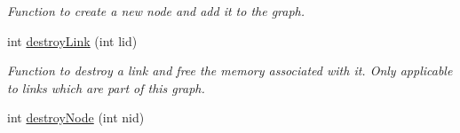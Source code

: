 \begin{DoxyCompactItemize}
\begin{DoxyCompactList}\small\item\em Function to create a new node and add it to the graph. \end{DoxyCompactList}\item 
\hypertarget{classGraph_ab55f18c45c3ffa8c8d61a5517b856e17}{int \hyperlink{classGraph_ab55f18c45c3ffa8c8d61a5517b856e17}{destroy\+Link} (int lid)}\label{classGraph_ab55f18c45c3ffa8c8d61a5517b856e17}

\begin{DoxyCompactList}\small\item\em Function to destroy a link and free the memory associated with it. Only applicable to links which are part of this graph. \end{DoxyCompactList}\item 
\hypertarget{classGraph_a622e2c0ef87a8dd227d0ac04140e6680}{int \hyperlink{classGraph_a622e2c0ef87a8dd227d0ac04140e6680}{destroy\+Node} (int nid)}\label{classGraph_a622e2c0ef87a8dd227d0ac04140e6680}


\end{DoxyCompactItemize}
